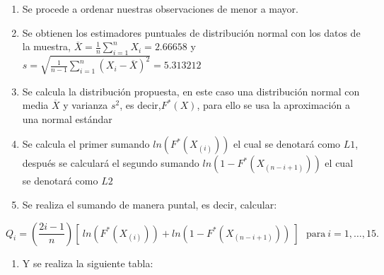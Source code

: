 \documentclass[
  a4paper,
  oneside,
  openany]{book}
\providecommand{\tightlist}{%
  \setlength{\itemsep}{0pt}\setlength{\parskip}{0pt}}
\begin{document}
\begin{enumerate}
\def\labelenumi{\arabic{enumi})}
\item
  Se procede a ordenar nuestras observaciones de menor a mayor.
\item
  Se obtienen los estimadores puntuales de distribución normal con los datos de la muestra,
  \(\overline{X}=\frac{1}{n}\sum_{i=1}^{n}X_{i}= 2.66658\) y \(s=\sqrt{\frac{1}{n-1}\sum_{i=1}^{n}(X_{i}-\overline{X})^2}=5.313212\)
\item
  Se calcula la distribución propuesta, en este caso una distribución normal con media \(\overline{X}\) y varianza \(s^2\), es decir,\(F^*(X)\), para ello se usa la aproximación a una normal estándar
\item
  Se calcula el primer sumando \(ln(F^*(X_{(i)}))\) el cual se denotará como \(L1\), después se calculará el segundo sumando \(ln(1-F^*(X_{(n-i+1)}))\) el cual se denotará como \(L2\)
\item
  Se realiza el sumando de manera puntal, es decir, calcular:
\end{enumerate}

\[Q_{i}=\left(\frac{2i-1}{n}\right)[ \ ln(F^*(X_{(i)})) +ln(1-F^*(X_{(n-i+1)})) \ ] \ \ \ \mbox{para} \  i=1,\ldots,15.\]

\begin{enumerate}
\def\labelenumi{\arabic{enumi})}
\setcounter{enumi}{5}
\tightlist
\item
  Y se realiza la siguiente tabla:
\end{enumerate}
\end{document}
